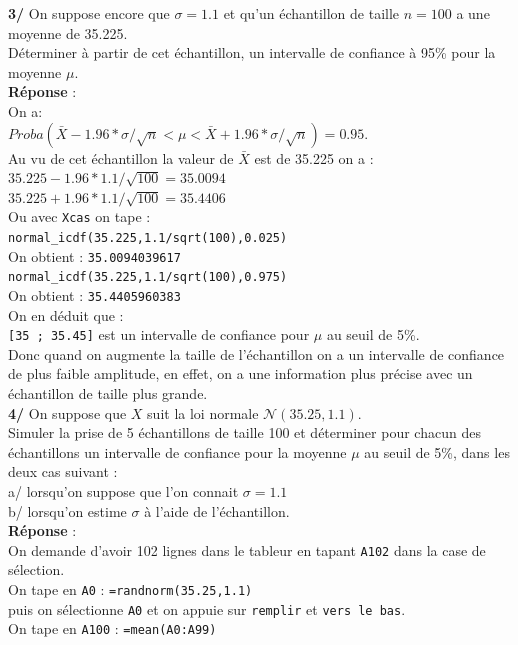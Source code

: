 \documentclass[a4paper,11pt]{book}
\begin{document}
{\bf 3/} On suppose encore que $\sigma=1.1$ et qu'un \'echantillon de taille 
$n=100$ a une moyenne de 35.225.\\
 D\'eterminer \`a partir de cet \'echantillon, 
un intervalle de confiance \`a 95\% pour la moyenne $\mu$.\\  
{\bf R\'eponse} :\\
On a:\\ 
$Proba(\bar X-1.96*\sigma/\sqrt n<\mu<\bar X+1.96*\sigma/\sqrt n)=0.95$.\\ 
Au vu de cet \'echantillon la valeur de $\bar X$ est de 35.225 on a :\\
$35.225-1.96*1.1/\sqrt{100}=35.0094$\\
$35.225+1.96*1.1/\sqrt{100}=35.4406$\\
Ou avec {\tt Xcas} on tape :\\
{\tt normal\_icdf(35.225,1.1/sqrt(100),0.025)} \\
On obtient : {\tt 35.0094039617}\\
{\tt normal\_icdf(35.225,1.1/sqrt(100),0.975)}\\
On obtient : {\tt 35.4405960383}\\
On en d\'eduit que :\\
{\tt [35 ; 35.45]} est un intervalle de confiance  pour $\mu$ au seuil de 5\%.\\
Donc quand on augmente la taille de l'\'echantillon on a un intervalle de 
confiance de plus faible amplitude, en effet, on a une information plus 
pr\'ecise avec un \'echantillon de taille plus grande.\\
{\bf4/} On suppose que $X$ suit la loi normale $\mathcal N(35.25,1.1)$.\\
Simuler la prise de 5 \'echantillons de taille 100 et d\'eterminer pour 
chacun des \'echantillons un intervalle de 
confiance pour la moyenne $\mu$ au seuil de 5\%, dans les deux cas suivant :\\ 
a/ lorsqu'on suppose que l'on connait $\sigma=1.1$\\
b/ lorsqu'on estime $\sigma$ \`a l'aide de l'\'echantillon.\\
{\bf R\'eponse} :\\
On demande d'avoir 102 lignes dans le tableur en tapant {\tt A102} dans la case
 de s\'election.\\
On tape en {\tt A0} : {\tt =randnorm(35.25,1.1)}\\
puis on s\'electionne {\tt A0} et on appuie sur {\tt remplir} et 
{\tt vers le bas}.\\
On tape en {\tt A100} : {\tt =mean(A0:A99)}\\
\end{document}
